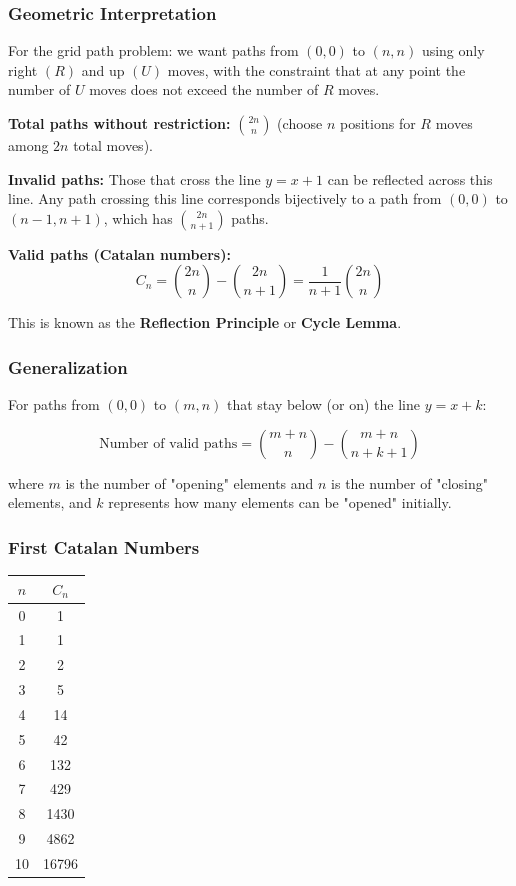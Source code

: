 \subsubsection{Geometric Interpretation}

For the grid path problem: we want paths from $(0,0)$ to $(n,n)$ using only right $(R)$ and up $(U)$ moves, with the constraint that at any point the number of $U$ moves does not exceed the number of $R$ moves.

\textbf{Total paths without restriction:} $\binom{2n}{n}$ (choose $n$ positions for $R$ moves among $2n$ total moves).

\textbf{Invalid paths:} Those that cross the line $y = x + 1$ can be reflected across this line. Any path crossing this line corresponds bijectively to a path from $(0,0)$ to $(n-1, n+1)$, which has $\binom{2n}{n+1}$ paths.

\textbf{Valid paths (Catalan numbers):}
\[ C_n = \binom{2n}{n} - \binom{2n}{n+1} = \frac{1}{n+1}\binom{2n}{n} \]

This is known as the \textbf{Reflection Principle} or \textbf{Cycle Lemma}.

\subsubsection{Generalization}

For paths from $(0,0)$ to $(m,n)$ that stay below (or on) the line $y = x + k$:

\[ \text{Number of valid paths} = \binom{m+n}{n} - \binom{m+n}{n+k+1} \]

where $m$ is the number of "opening" elements and $n$ is the number of "closing" elements, and $k$ represents how many elements can be "opened" initially.

\subsubsection{First Catalan Numbers}

\begin{center}
\begin{tabular}{c|c}
$n$ & $C_n$ \\
\hline
0 & 1 \\
1 & 1 \\
2 & 2 \\
3 & 5 \\
4 & 14 \\
5 & 42 \\
6 & 132 \\
7 & 429 \\
8 & 1430 \\
9 & 4862 \\
10 & 16796 \\
\end{tabular}
\end{center}
